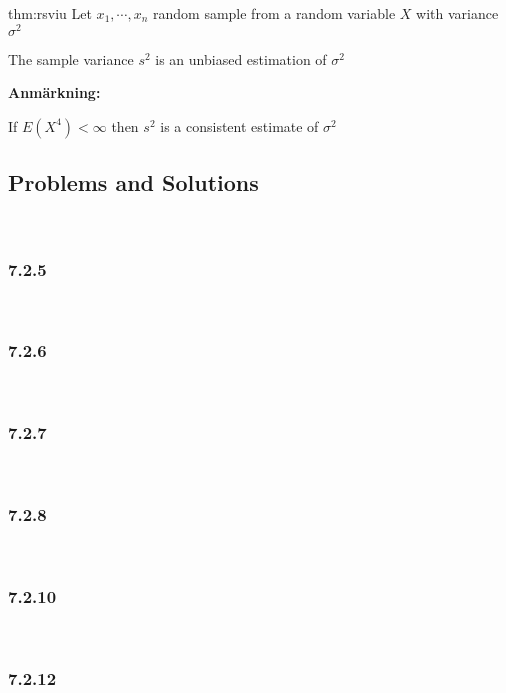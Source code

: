 \par\bigskip
\begin{theo}{thm:rsviu}
  Let $x_1,\cdots,x_n$ random sample from a random variable $X$ with variance $\sigma^2$ 
  \par\bigskip
  \noindent The sample variance $s^2$ is an unbiased estimation of $\sigma^2$ 
\end{theo}
\par\bigskip
\noindent\textbf{Anmärkning:}\par
\noindent If $E(X^4)<\infty$ then  $s^2$ is a consistent estimate of $\sigma^2$ 

\par\bigskip
\subsection{Problems and Solutions}\hfill\\\par
\subsubsection{7.2.5}\hfill\\\par
\par\bigskip
\subsubsection{7.2.6}\hfill\\\par
\par\bigskip
\subsubsection{7.2.7}\hfill\\\par
\par\bigskip
\subsubsection{7.2.8}\hfill\\\par
\par\bigskip
\subsubsection{7.2.10}\hfill\\\par
\par\bigskip
\subsubsection{7.2.12}\hfill\\\par
\par\bigskip
